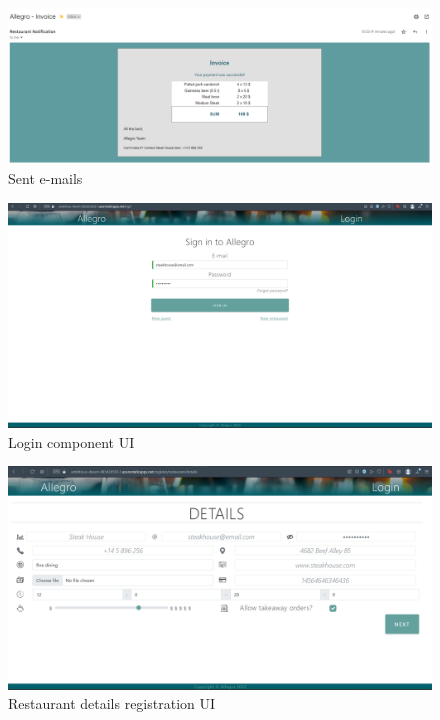 \begin{figure}[ht]
	\centering
	\includegraphics[width=150mm, keepaspectratio]{figures/UI/7_Email_2.png}
	\caption{Sent e-mails} 
	\label{fig:UI_7}
\end{figure}

\begin{figure}[ht]
	\centering
	\includegraphics[width=150mm, keepaspectratio]{figures/UI/8_Login.png}
	\caption{Login component UI} 
	\label{fig:UI_8}
\end{figure}

\begin{figure}[ht]
	\centering
	\includegraphics[width=150mm, keepaspectratio]{figures/UI/9_RestaurantDetailsEdit.png}
	\caption{Restaurant details registration UI} 
	\label{fig:UI_9}
\end{figure}

